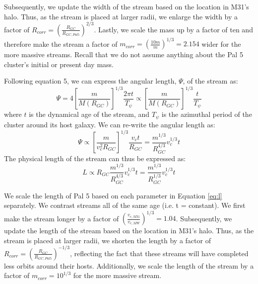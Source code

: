 \documentclass[twocolumn]{aastex62}
\newcommand{\todo}[1]{{\color{red} TODO: #1}}
\begin{document}
Subsequently, we update the width of the stream based on the location in M31's halo. Thus, as the stream is placed at larger radii, we enlarge the width by a factor of  $R_{corr} = \left(\frac{R_{GC}}{R_{GC,Pal5}}\right)^{2/3}$. Lastly, we scale the mass up by a factor of ten and therefore make the stream a factor of $m_{corr} = \left(\frac{10m}{m}\right)^{1/3}= 2.154$ wider for the more massive streams. Recall that we do not assume anything about the Pal 5 cluster's initial or present day mass. 


Following \citet{johnston01} equation 5, we can express the angular length, $\Psi$, of the stream as:
\begin{equation}
\Psi = 4  \left[\frac{m}{M(R_{GC})}\right]^{1/3}  \frac{2 \pi t}{T_{\psi}} \propto \left[\frac{m}{M(R_{GC})}\right]^{1/3}  \frac{t}{T_{\psi}}
\end{equation}
where $t$ is the dynamical age of the stream, and $T_{\psi}$ is the azimuthal period of the cluster around its host galaxy. We can re-write the angular length as:
\begin{equation}
\Psi \propto \left[\frac{m }{v_c^2 R_{GC}}\right]^{1/3}  \frac{v_c t }{R_{GC}} = \frac{m^{1/3}}{R_{GC}^{4/3}} v_c^{1/3}t
\end{equation}
The physical length of the stream can thus be expressed as:
\begin{equation}
\label{eq:l}
L \propto R_{GC} \frac{m^{1/3}}{R_{GC}^{4/3}} v_c^{1/3}t = \frac{m^{1/3}}{R_{GC}^{1/3}} v_c^{1/3}t
\end{equation}

We scale the length of Pal 5 based on each parameter in Equation \ref{eq:l} separately. We contrast streams all of the same age (i.e.  t = constant). We first make the stream longer by a factor of $(\frac{v_{c,M31}}{v_{c,MW}})^{1/3} = 1.04$. Subsequently, we update the length of the stream based on the location in M31's halo. Thus, as the stream is placed at larger radii, we shorten the length by a factor of  $R_{corr} = \left(\frac{R_{GC}}{R_{GC,Pal5}}\right)^{-1/3}$, reflecting the fact that these streams will have completed less orbits around their hosts. %
Additionally, we scale the length of the stream by a factor of $m_{corr} = 10^{1/3}$ for the more massive stream. 
\end{document}
